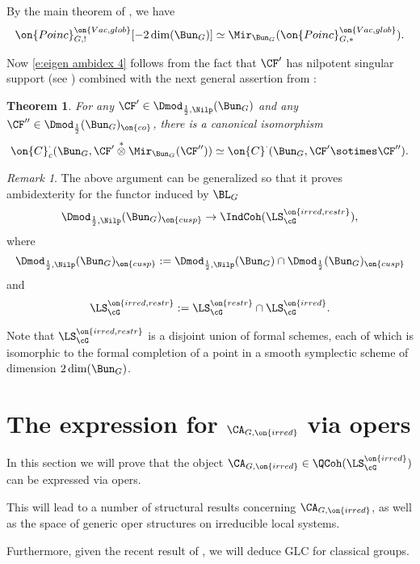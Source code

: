 \documentclass[9pt]{amsart}
\newtheorem{thm}[subsubsection]{Theorem}
\theoremstyle{remark}
\newtheorem{rem}[subsubsection]{Remark}
\theoremstyle{definition}
\theoremstyle{remark}
\numberwithin{equation}{section}
\begin{document}
\sssec{}

By the main theorem of \cite{Lin}, we have
$$\on{Poinc}^{\on{Vac,glob}}_{G,!}[-2\dim(\Bun_G)] \simeq \Mir_{\Bun_G}(\on{Poinc}^{\on{Vac,glob}}_{G,*}).$$

Now \eqref{e:eigen ambidex 4} follows from the fact that $\CF'$ has nilpotent singular support (see \cite[Corollary 14.4.10]{AGKRRV1})
combined with the next general assertion from \cite[Theorem 3.4.2]{AGKRRV2}:

\begin{thm}
For any $\CF'\in \Dmod_{\frac{1}{2},\Nilp}(\Bun_G)$ and any $\CF''\in \Dmod_{\frac{1}{2}}(\Bun_G)_{\on{co}}$,
there is a canonical isomorphism
$$\on{C}^\cdot_c(\Bun_G,\CF'\overset{*}\otimes \Mir_{\Bun_G}(\CF''))\simeq
\on{C}^\cdot(\Bun_G,\CF'\sotimes \CF'').$$
\end{thm} 

\begin{rem} \label{r:Nilp amb}
The above argument can be generalized so that it proves ambidexterity for the functor induced by $\BL_G$
$$\Dmod_{\frac{1}{2},\Nilp}(\Bun_G)_{\on{cusp}}\to \IndCoh(\LS^{\on{irred,restr}}_\cG),$$
where 
$$\Dmod_{\frac{1}{2},\Nilp}(\Bun_G)_{\on{cusp}}:=\Dmod_{\frac{1}{2},\Nilp}(\Bun_G)\cap \Dmod_{\frac{1}{2}}(\Bun_G)_{\on{cusp}}$$ and 
$$\LS^{\on{irred,restr}}_\cG:=\LS^{\on{restr}}_\cG\cap \LS^{\on{irred}}_\cG.$$

Note that $\LS^{\on{irred,restr}}_\cG$ is a disjoint union of formal schemes, each of which is isomorphic to
the formal completion of a point in a smooth symplectic scheme of dimension $2\dim(\Bun_G)$. 
\end{rem} 



\section{The expression for \texorpdfstring{$\CA_{G,\on{irred}}$}{AGirred} via opers} \label{s:opers}

In this section we will prove that the object $\CA_{G,\on{irred}}\in \QCoh(\LS^{\on{irred}}_\cG)$ can be expressed 
via opers.

\medskip

This will lead to a number of structural results concerning $\CA_{G,\on{irred}}$, as well as the space of generic oper
structures on irreducible local systems. 

\medskip

Furthermore, given the recent result of \cite{BKS}, we will deduce GLC for classical groups. 
\end{document}
